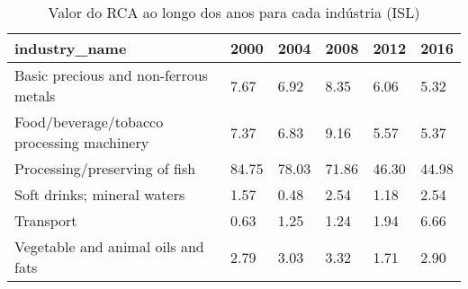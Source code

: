 \begin{table}
\centering
\caption{Valor do RCA ao longo dos anos para cada indústria (ISL)}
\begin{tabular}{p{6cm}p{1.5cm}p{1.5cm}p{1.5cm}p{1.5cm}p{1.5cm}}
\toprule
                             industry\_name &  2000 &  2004 &  2008 &  2012 &  2016 \\
\midrule
     Basic precious and non-ferrous metals &  7.67 &  6.92 &  8.35 &  6.06 &  5.32 \\
Food/beverage/tobacco processing machinery &  7.37 &  6.83 &  9.16 &  5.57 &  5.37 \\
             Processing/preserving of fish & 84.75 & 78.03 & 71.86 & 46.30 & 44.98 \\
               Soft drinks; mineral waters &  1.57 &  0.48 &  2.54 &  1.18 &  2.54 \\
                                 Transport &  0.63 &  1.25 &  1.24 &  1.94 &  6.66 \\
        Vegetable and animal oils and fats &  2.79 &  3.03 &  3.32 &  1.71 &  2.90 \\
\bottomrule
\end{tabular}
\end{table}
